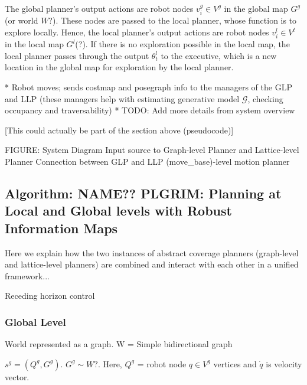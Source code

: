 \documentclass{article}
\begin{document}
The global planner's output actions are robot nodes $v^g_i \in V^g$ in the global map $G^g$ (or world $W$?). These nodes are passed to the local planner, whose function is to explore locally. Hence, the local planner's output actions are robot nodes $v^l_i \in V^l$ in the local map $G^l$(?). If there is no exploration possible in the local map, the local planner passes through the output $\theta^l_t$ to the executive, which is a new location in the global map for exploration by the local planner.




* Robot moves; sends costmap and posegraph info to the managers of the GLP and LLP (these managers help with estimating generative model $\mathcal{G}$, checking occupancy and traversability)
* TODO: Add more details from system overview

[This could actually be part of the section above (pseudocode)]


FIGURE: System Diagram
Input source to Graph-level Planner and Lattice-level Planner 
Connection between GLP and LLP
(move\_base)-level motion planner





\subsection{Algorithm: NAME?? PLGRIM: Planning at Local and Global levels with Robust Information Maps}

Here we explain how the two instances of abstract coverage planners (graph-level and lattice-level planners) are combined and interact with each other in a unified framework...

Receding horizon control



\subsubsection{Global Level}
World represented as a graph. W = Simple bidirectional graph

$s^g = (Q^g, G^g)$. $G^g \sim W?$. Here, $Q^g$ = robot node $q \in V^g$ vertices  and $\dot{q}$ is velocity vector.
\end{document}
